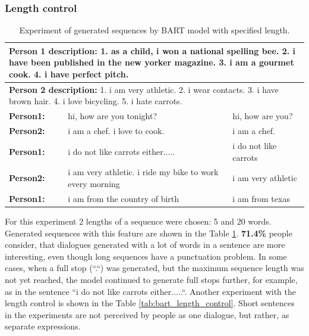 \subsubsection{Length control}
\begin{table}[ht]
\centering
 \begin{tabular}{|p{2cm}|p{6cm}|p{6cm}|} 
 \hline
 \multicolumn{3}{|p{14cm}|}{\textbf{Person 1 description:} 1. as a child, i won a national spelling bee. 2. i have been published in the new yorker magazine. 3. i am a gourmet cook. 4. i have perfect pitch. }\\
 \hline
 \multicolumn{3}{|p{14cm}|}{\textbf{Person 2 description:} 1. i am very athletic. 2. i wear contacts. 3. i have brown hair. 4. i love bicycling. 5. i hate carrots.} \\
 \hline
 \textbf{Person1:} & hi, how are you tonight? & hi, how are you?\\
 \hline
 \textbf{Person2:} & i am a chef. i love to cook. & i am a chef. \\
 \hline
 \textbf{Person1:} & i do not like carrots either..... & i do not like carrots\\
 \hline 
 \textbf{Person2:} & i am very athletic. i ride my bike to work every morning & i am very athletic\\
 \hline 
 \textbf{Person1:} & i am from the country of birth & i am from texas\\
 \hline
 \end{tabular}
 \caption{Experiment of generated sequences by BART model with specified length.}
\label{tab:set_len}
\end{table}
For this experiment 2 lengths of a sequence were chosen: 5 and 20 words. Generated sequences with this feature are shown in the Table \ref{tab:set_len}. \textbf{71.4\%} people consider, that dialogues generated with a lot of words in a sentence are more interesting, even though long sequences have a punctuation problem. In some cases, when a full stop (``.``) was generated, but the maximum sequence length was not yet reached, the model continued to generate full stops further, for example, as in the sentence ``i do not like carrots either.....``. Another experiment with the length control is shown in the Table \ref{tab:bart_length_control}. Short sentences in the experiments are not perceived by people as one dialogue, but rather, as separate expressions.

